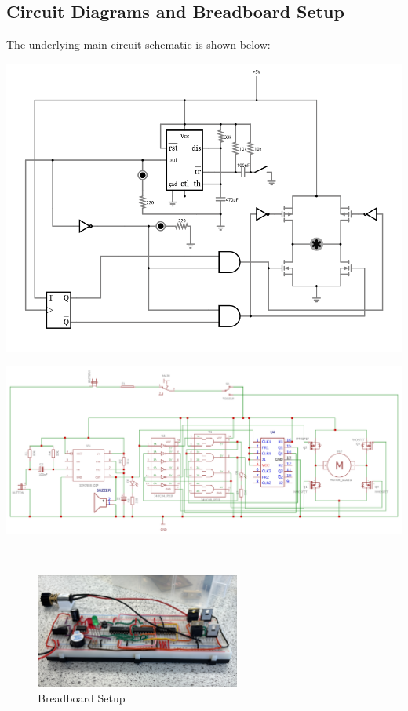\documentclass{article}
\begin{document}
\subsection{Circuit Diagrams and Breadboard Setup}
The underlying main circuit schematic is shown below:\\
\hspace*{-2em}
\begin{minipage}{0.4\textwidth}
	\centering
	\includegraphics[width=1\textwidth]{images/swappy-20250406-185116.png}
\end{minipage}\hspace{1em}
\begin{minipage}{0.5\textwidth}
	\centering
	\includegraphics[width=1.3\textwidth]{images/Schematic_SAKARIYEPCB.sch_2025-04-06_page-0001.jpg}
\end{minipage}\\
\begin{figure}[H]
	\centering
	\includegraphics[width=0.6\textwidth]{images/Image(2).jpg}
	\caption{Breadboard Setup}
\end{figure}\noindent
\end{document}
